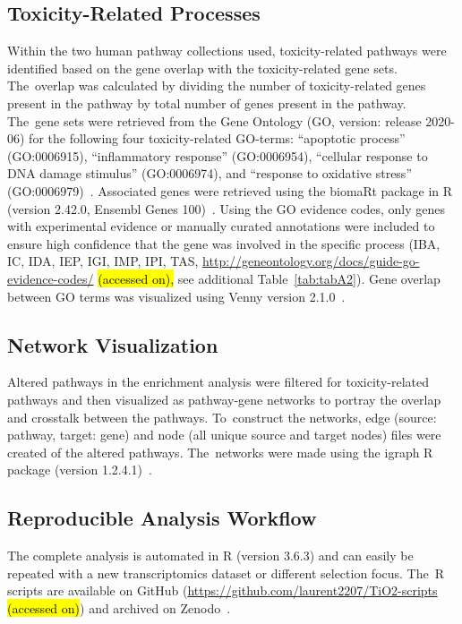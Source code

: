 \documentclass[ijms,article,accept,moreauthors,pdftex]{Definitions/mdpi}
\begin{document}
\begin{paracol}{2}
\subsection{Toxicity-Related Processes}
Within the two human pathway collections used, toxicity-related pathways were identified based on the gene overlap with the toxicity-related gene sets. The~overlap was calculated by dividing the number of toxicity-related genes present in the pathway by total number of genes present in the pathway. The~gene sets were retrieved from the Gene Ontology (GO, version: release 2020-06) for the following four toxicity-related GO-terms: “apoptotic process” (GO:0006915), “inflammatory response” (GO:0006954), “cellular response to DNA damage stimulus” (GO:0006974), and “response to oxidative stress” (GO:0006979)~\cite{Ashburner2000,Carbon2020}. Associated genes were retrieved using the biomaRt package in R (version 2.42.0, Ensembl Genes 100)~\cite{Durinck2005,Durinck2009}. Using the GO evidence codes, only genes with experimental evidence or manually curated annotations were included to ensure high confidence that the gene was involved in the specific process (IBA, IC, IDA, IEP, IGI, IMP, IPI, TAS, \url{http://geneontology.org/docs/guide-go-evidence-codes/} \hl{(accessed on),}  see additional Table~\ref{tab:tabA2}). Gene overlap between GO terms was visualized using Venny version 2.1.0~\cite{Venny}. 

\subsection{Network Visualization}
Altered pathways in the enrichment analysis were filtered for toxicity-related pathways and then visualized as pathway-gene networks to portray the overlap and crosstalk between the pathways. To~construct the networks, edge (source: pathway, target: gene) and node (all unique source and target nodes) files were created of the altered pathways. The~networks were made using the igraph R package (version 1.2.4.1)~\cite{Csardi2006}.

\subsection{Reproducible Analysis Workflow}
The complete analysis is automated in R (version 3.6.3) and can easily be repeated with a new transcriptomics dataset or different selection focus. The~R scripts are available on GitHub (\url{https://github.com/laurent2207/TiO2-scripts} \hl{(accessed on)}) and archived on Zenodo~\cite{TiO2-scripts}.


\end{paracol}
\end{document}
